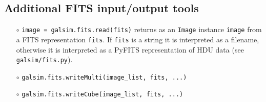 \documentclass[preprint,11pt]{aastex}
\begin{document}
\subsection{Additional FITS input/output tools}\label{sect:multifits}

\begin{itemize}

\item[$\circ$] \texttt{image = galsim.fits.read(fits)} \newline
{returns as an \texttt{Image} instance \texttt{image} from a FITS
  representation \texttt{fits}.  If \texttt{fits} is a string it is
  interpreted as a filename, otherwise it is interpreted as a PyFITS
  representation of HDU data (see
  \texttt{galsim/fits.py}).}
\item[$\circ$] \texttt{galsim.fits.writeMulti(image\_list, fits, ...)}
\item[$\circ$] \texttt{galsim.fits.writeCube(image\_list, fits, ...)}

\end{itemize}
\end{document}
